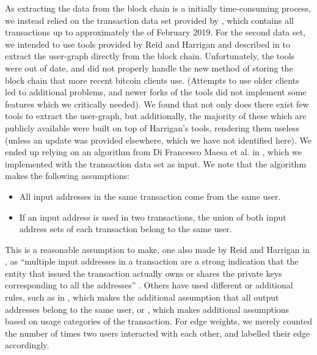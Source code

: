 \documentclass{article}
\begin{document}
As extracting the data from the block chain is a initially time-consuming process, 
we instead relied on the transaction data set provided by \cite{mit data set}, which contains
all transactions up to approximately the  of February 2019. For the second data set,
we intended to use tools provided by Reid and Harrigan and described in \cite{extraction}
to extract the user-graph directly from the block chain. Unfortunately, the tools were
out of date, and did not properly handle the new method of storing the block chain that
more recent bitcoin clients use. (Attempts to use older clients led to additional
problems, and newer forks of the tools did not implement some features which we 
critically needed). We found that not only does there exist few tools to extract the 
user-graph, but additionally, the majority of these which are publicly available were 
built on top of Harrigan's tools, rendering them useless (unless an update was provided 
elsewhere, which we have not identified here). We ended up relying on an algorithm from 
Di Francesco Maesa et al. in \cite{user graph algo}, which we implemented \cite{implementation}
 with the transaction data set as input. We note that the algorithm makes the following assumptions:
\begin{itemize}
    \item All input addresses in the same transaction come from the same user.
    \item If an input address is used in two transactions, the union of both input 
    address sets of each transaction belong to the same user.
\end{itemize}
This is a reasonable assumption to make, one also made by Reid and Harrigan in 
\cite{extraction}, as ``multiple input addresses in a transaction are a strong indication 
that the entity that issued the transaction actually owns or shares the private keys 
corresponding to all the addresses'' \cite{hal}. Others have used different or additional 
rules, such as in \cite{hal}, which makes the additional assumption that all output addresses 
belong to the same user, or \cite{fistful}, which makes additional assumptions based on usage 
categories of the transaction.
For edge weights, we merely counted the number of times two users interacted with each 
other, and labelled their edge accordingly.
\end{document}
